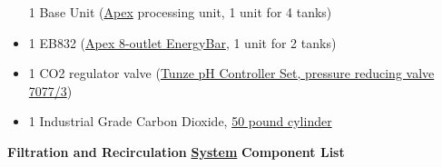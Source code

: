 \documentclass[]{book}
\begin{document}
\begin{itemize}
  1 Base Unit
  (\href{https://github.com/SilbigerLab/Mesocosm_User_Manual/blob/master/Manuals/Apex_Comprehensive_Reference_Manual.pdf}{Apex}
  processing unit, 1 unit for 4 tanks)\\
\item
  1 EB832
  (\href{https://github.com/SilbigerLab/Mesocosm_User_Manual/blob/master/Manuals/EB832_Guide.pdf}{Apex
  8-outlet EnergyBar}, 1 unit for 2 tanks)\\
\item
  1 CO2 regulator valve
  (\href{https://github.com/SilbigerLab/Mesocosm_User_Manual/blob/master/Manuals/Tunze_CO2_Regulator.pdf}{Tunze
  pH Controller Set, pressure reducing valve 7077/3})\\
\item
  1 Industrial Grade Carbon Dioxide,
  \href{https://www.airgas.com/product/Gases/Industrial-Application-Gases/Carbon-Dioxide---Industrial/p/CD\%2050}{50
  pound cylinder}
\end{itemize}

 \textbf{Filtration and Recirculation}
\href{https://github.com/SilbigerLab/Mesocosm_User_Manual/blob/master/Manuals/Filtration_Skid_Build_Package.pdf}{\textbf{System}}
\textbf{Component List}
\end{document}
